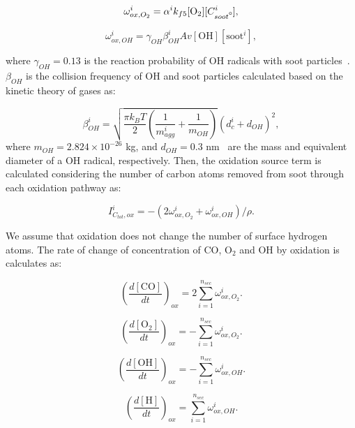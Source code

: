 \begin{equation}
	\omega^i_{ox,O_2} = \alpha^i k_{f5} [\mathrm{O_2}][C^i_{soot\mbox{\textdegree}}],
	\label{eqn:hacaO2Rate}
\end{equation}

\begin{equation}
	\omega^i_{ox,OH} = \gamma_{OH} \beta^i_{OH} Av [\mathrm{OH}][\mathrm{soot}^i],
	\label{eqn:hacaOHRate}
\end{equation}

\noindent where $\gamma_{OH}=0.13$ is the reaction probability of OH radicals with soot particles~\citep{appel2000kinetic}. $\beta_{OH}$ is the collision frequency of OH and soot particles calculated based on the kinetic theory of gases as:

\begin{equation}
	\beta^i_{OH} = 
	\sqrt{
		\frac{\pi k_B T}{2}\left(\frac{1}{m^i_{agg}}+\frac{1}{m_{OH}}\right)
	}
	\left(d^i_c+d_{OH}\right)^2,
	\label{eqn:betaOH}
\end{equation}
\noindent where $m_{OH}=2.824\times10^{-26}$ kg, and $d_{OH}=0.3$ nm~\citep{shepherd2022measurement} are the mass and equivalent diameter of a OH radical, respectively. Then, the oxidation source term is calculated considering the number of carbon atoms removed from soot through each oxidation pathway as:

\begin{equation}
	I^i_{C_{tot},ox} = -(2\omega^i_{ox,O_2} + \omega^i_{ox,OH})/\rho
	\label{eqn:ICtot}.
\end{equation}

We assume that oxidation does not change the number of surface hydrogen atoms. The rate of change of concentration of CO, $\mathrm{O_2}$ and OH by oxidation is calculates as:

\begin{equation}
	\left(\frac{d\left[{\mathrm{CO}}\right]}{dt}\right)_{ox} = 2\sum_{i=1}^{n_{sec}}\omega^i_{ox,O_2}
	\label{eqn:COrate_ox}.
\end{equation}

\begin{equation}
	\left(\frac{d\left[{\mathrm{O_2}}\right]}{dt}\right)_{ox} = -\sum_{i=1}^{n_{sec}}\omega^i_{ox,O_2}
	\label{eqn:O2rate_ox}.
\end{equation}

\begin{equation}
	\left(\frac{d\left[{\mathrm{OH}}\right]}{dt}\right)_{ox} = -\sum_{i=1}^{n_{sec}}\omega^i_{ox,OH}
	\label{eqn:Hrate_ox}.
\end{equation}

\begin{equation}
	\left(\frac{d\left[{\mathrm{H}}\right]}{dt}\right)_{ox} = \sum_{i=1}^{n_{sec}}\omega^i_{ox,OH}
	\label{eqn:OHrate_ox}.
\end{equation}